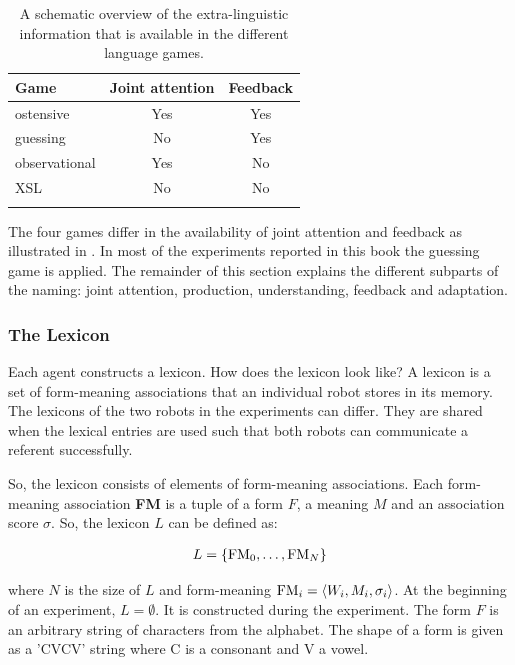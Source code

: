 \begin{table}[t]
\centering
\begin{tabular}{lcc}
\lsptoprule
Game & Joint attention & Feedback\\
\midrule
ostensive & Yes & Yes\\
guessing & No & Yes\\
observational & Yes & No\\
XSL & No & No\\
\lspbottomrule
\end{tabular}
\caption{A schematic overview of the extra-linguistic information that is available in the different language games.}
\label{t:cm:games}
\end{table}


The four games differ in the availability of joint attention and feedback as illustrated in . In most of the experiments reported in this book the guessing game is applied. The remainder of this section explains the different subparts of the naming: joint attention, production, understanding, feedback and adaptation.

\subsubsection{The Lexicon}

Each agent constructs a lexicon. How does the lexicon look like? A lexicon is a set of form-meaning associations that an individual robot stores in its memory. The lexicons of the two robots in the experiments can differ. They are shared when the lexical entries are used such that both robots can communicate a referent successfully. 

So, the lexicon consists of elements of form-meaning associations. Each form-meaning association {\bf FM} is a tuple of a form $F$, a meaning $M$ and an association score $\sigma$. So, the lexicon $L$ can be defined as:

\begin{eqnarray}
L=\{{\bf \mbox{FM}}_0, \ldots, {\bf \mbox{FM}}_N\}
\end{eqnarray}

\noindent
where $N$ is the size of $L$ and form-meaning ${\bf \mbox{FM}}_i=\langle W_i,M_i,\sigma_i\rangle$. At the beginning of an experiment, $L=\emptyset$. It is constructed during the experiment. The form $F$ is an arbitrary string of characters from the alphabet. The shape of a form is given as a 'CVCV' string where C is a consonant and V a vowel.


